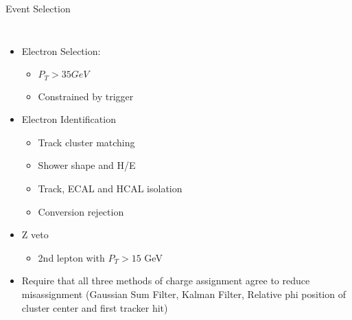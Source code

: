 \documentclass[t, 8pt]{beamer}
\begin{document}
\begin{frame}{Event Selection}
  \begin{columns}[c]
  \begin{itemize}
    \item Electron Selection:
    \begin{itemize}
      \item $P_T > 35 GeV$
      \item Constrained by trigger
    \end{itemize}
    \item Electron Identification
    \begin{itemize}
      \item Track cluster matching
      \item Shower shape and H/E
      \item Track, ECAL and HCAL isolation
      \item Conversion rejection
    \end{itemize}
    \item Z veto
    \begin{itemize}
      \item 2nd lepton with $P_T > 15$ GeV
    \end{itemize}
    \item Require that all three methods of charge assignment agree to reduce
    misassignment (Gaussian Sum Filter, Kalman Filter, Relative phi position of
    cluster center and first tracker hit)
  \end{itemize}


\end{columns}
\end{frame}
\end{document}
